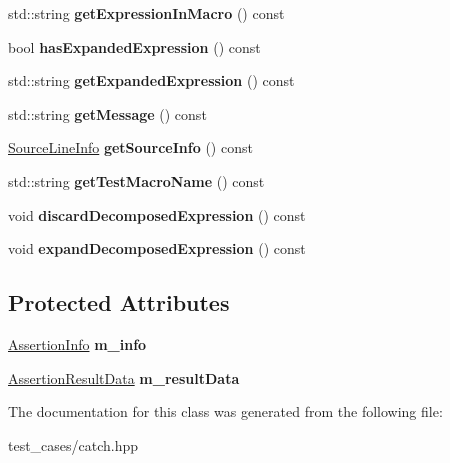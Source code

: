 \begin{DoxyCompactItemize}
std\+::string {\bfseries get\+Expression\+In\+Macro} () const
\item 
\mbox{\label{classCatch_1_1AssertionResult_a78c43506c2b3d8cc1fb141a97d09ec94}} 
bool {\bfseries has\+Expanded\+Expression} () const
\item 
\mbox{\label{classCatch_1_1AssertionResult_aaa46070791a6c07caaed86229b8d9d75}} 
std\+::string {\bfseries get\+Expanded\+Expression} () const
\item 
\mbox{\label{classCatch_1_1AssertionResult_ae730943beed46921b09383c673e35786}} 
std\+::string {\bfseries get\+Message} () const
\item 
\mbox{\label{classCatch_1_1AssertionResult_aa4d3fdbfe276a69a035762dbb790800f}} 
\hyperlink{structCatch_1_1SourceLineInfo}{Source\+Line\+Info} {\bfseries get\+Source\+Info} () const
\item 
\mbox{\label{classCatch_1_1AssertionResult_aaefd9a0384282fd08a4a72aa19bd0628}} 
std\+::string {\bfseries get\+Test\+Macro\+Name} () const
\item 
\mbox{\label{classCatch_1_1AssertionResult_a406884d8b8209c80078706724c528df5}} 
void {\bfseries discard\+Decomposed\+Expression} () const
\item 
\mbox{\label{classCatch_1_1AssertionResult_ac0b1d268a3ffa1f1fb305cad9435d824}} 
void {\bfseries expand\+Decomposed\+Expression} () const
\end{DoxyCompactItemize}
\subsection*{Protected Attributes}
\begin{DoxyCompactItemize}
\item 
\mbox{\label{classCatch_1_1AssertionResult_a3e7236f73a51d6fc8bb9dfdefcee7772}} 
\hyperlink{structCatch_1_1AssertionInfo}{Assertion\+Info} {\bfseries m\+\_\+info}
\item 
\mbox{\label{classCatch_1_1AssertionResult_add3455b8bbedb0d643e18da67c66b4f7}} 
\hyperlink{structCatch_1_1AssertionResultData}{Assertion\+Result\+Data} {\bfseries m\+\_\+result\+Data}
\end{DoxyCompactItemize}


The documentation for this class was generated from the following file\+:\begin{DoxyCompactItemize}
\item 
test\+\_\+cases/catch.\+hpp\end{DoxyCompactItemize}
